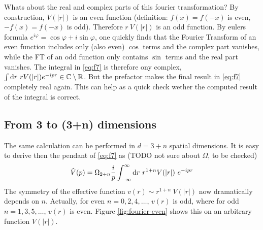 \documentclass[10pt,a4paper, fleqn]{article}
\begin{document}
\begin{appendices}
Whats about the real and complex parts of this fourier transformation? By construction, $V(|r|)$ is an even function (definition: $f(x)=f(-x)$ is even, $-f(x)=f(-x)$ is odd). Therefore $r~V(|r|)$ is an odd function. By eulers formula $e^{i\varphi} = \cos \varphi + i \sin \varphi$, one quickly finds that the Fourier Transform of an even function includes only (also even) $\cos$ terms and the complex part vanishes, while the FT of an odd function only contains $\sin$ terms and the real part vanishes. The integral in \eqref{eq:f7} is therefore ony complex, $\int \mathrm{d} r~rV(|r|)e^{-ipr} \in \mathbb{C} \setminus \mathbb{R}$. But the prefactor makes the final result in \eqref{eq:f7} completely real again. This can help as a quick check wether the computed result of the integral is correct.


\subsection{From 3 to (3+n) dimensions} \label{appendix:fourierN}
The same calculation can be performed in $d=3+n$ spatial dimensions. It is easy to derive then the pendant of \eqref{eq:f7} as (TODO not sure about $\Omega$, to be checked)
%
\begin{equation}
\hat V(p) = \Omega_{2+n} \frac{i}p \int_{-\infty}^\infty \mathrm{d} r~ r^{1+n} V(|r|)~e^{-ipr}  \label{eq:f7.2}
\end{equation}
%
The symmetry of the effective function $v(r)\sim r^{1+n}~V(|r|)$ now dramatically depends on $n$. Actually, for even $n=0,2,4,\dots$, $v(r)$ is odd, where for odd $n=1,3,5,\dots$, $v(r)$ is even. Figure \ref{fig:fourier-even} shows this on an arbitrary function $V(|r|)$.


\end{appendices}
\end{document}
